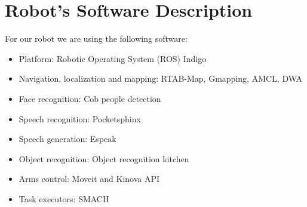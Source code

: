 \section*{Robot's Software Description}


For our robot we are using the following software:

\begin{itemize}
	\item Platform: Robotic Operating System (ROS) Indigo
	\item Navigation, localization and mapping: RTAB-Map, Gmapping, AMCL, DWA
	\item Face recognition: Cob people detection
	\item Speech recognition: Pocketsphinx
	\item Speech generation: Espeak
	\item Object recognition: Object recognition kitchen
	\item Arms control: Moveit and Kinova API
	\item Task executors: SMACH
\end{itemize}